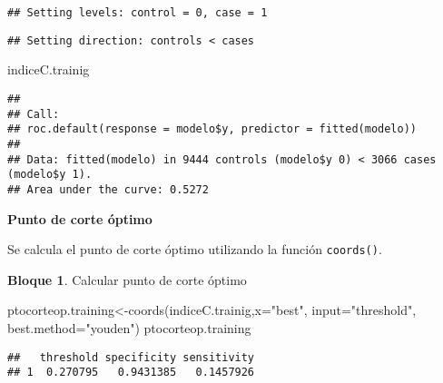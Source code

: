 \documentclass[
]{book}
\newenvironment{Shaded}{\begin{snugshade}}{\end{snugshade}}
\newcommand{\AttributeTok}[1]{\textcolor[rgb]{0.77,0.63,0.00}{#1}}
\newcommand{\CommentTok}[1]{\textcolor[rgb]{0.56,0.35,0.01}{\textit{#1}}}
\newcommand{\FunctionTok}[1]{\textcolor[rgb]{0.00,0.00,0.00}{#1}}
\newcommand{\NormalTok}[1]{#1}
\newcommand{\OtherTok}[1]{\textcolor[rgb]{0.56,0.35,0.01}{#1}}
\newcommand{\SpecialCharTok}[1]{\textcolor[rgb]{0.00,0.00,0.00}{#1}}
\newcommand{\StringTok}[1]{\textcolor[rgb]{0.31,0.60,0.02}{#1}}
\theoremstyle{definition}
\theoremstyle{definition}
\newtheorem{example}{Bloque}[chapter]
\theoremstyle{definition}
\theoremstyle{definition}
\theoremstyle{remark}
\begin{document}
\begin{Shaded}
\end{Shaded}

\begin{verbatim}
## Setting levels: control = 0, case = 1
\end{verbatim}

\begin{verbatim}
## Setting direction: controls < cases
\end{verbatim}

\begin{Shaded}
\begin{Highlighting}[]
\NormalTok{indiceC.trainig}
\end{Highlighting}
\end{Shaded}

\begin{verbatim}
## 
## Call:
## roc.default(response = modelo$y, predictor = fitted(modelo))
## 
## Data: fitted(modelo) in 9444 controls (modelo$y 0) < 3066 cases (modelo$y 1).
## Area under the curve: 0.5272
\end{verbatim}

\textbf{Punto de corte óptimo}

Se calcula el punto de corte óptimo utilizando la función \texttt{coords()}.

\begin{example}
\protect\hypertarget{exm:bloque18nbm}{}\label{exm:bloque18nbm}Calcular punto de corte óptimo
\end{example}

\begin{Shaded}
\begin{Highlighting}[]
\NormalTok{ptocorteop.training}\OtherTok{\textless{}{-}}\FunctionTok{coords}\NormalTok{(indiceC.trainig,}\AttributeTok{x=}\StringTok{"best"}\NormalTok{,}
                            \AttributeTok{input=}\StringTok{"threshold"}\NormalTok{,}
                            \AttributeTok{best.method=}\StringTok{"youden"}\NormalTok{)}
\NormalTok{ptocorteop.training}
\end{Highlighting}
\end{Shaded}

\begin{verbatim}
##   threshold specificity sensitivity
## 1  0.270795   0.9431385   0.1457926
\end{verbatim}
\end{document}
